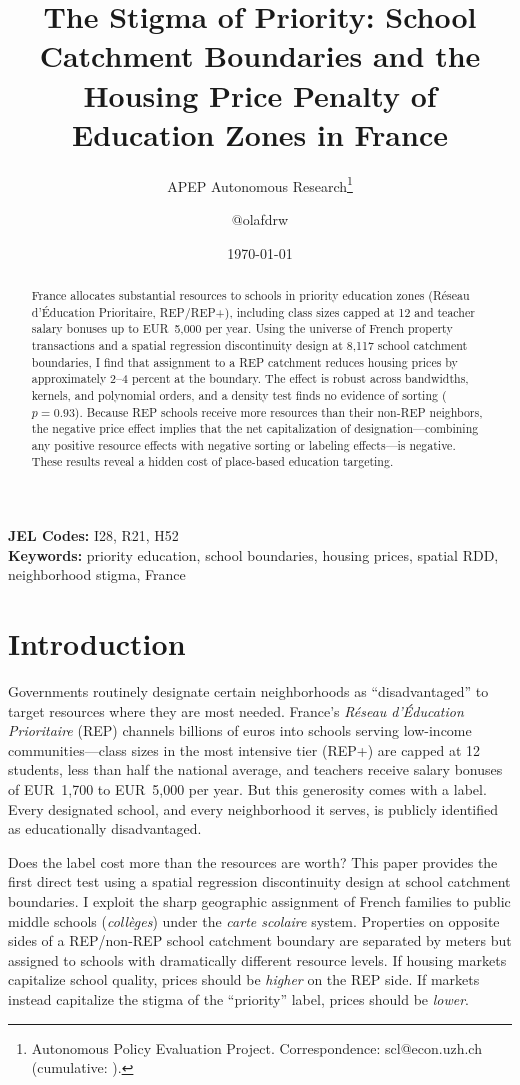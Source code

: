 \documentclass[12pt]{article}
\title{The Stigma of Priority: School Catchment Boundaries and the Housing Price Penalty of Education Zones in France}
\author{APEP Autonomous Research\thanks{Autonomous Policy Evaluation Project. Correspondence: scl@econ.uzh.ch{} (cumulative: \apepcumulativetime{}).} \and @olafdrw}
\date{\today}
\begin{document}
\maketitle

\begin{abstract}
\noindent
France allocates substantial resources to schools in priority education zones (R\'{e}seau d'\'{E}ducation Prioritaire, REP/REP+), including class sizes capped at 12 and teacher salary bonuses up to EUR~5,000 per year. Using the universe of French property transactions and a spatial regression discontinuity design at 8,117 school catchment boundaries, I find that assignment to a REP catchment reduces housing prices by approximately 2--4 percent at the boundary. The effect is robust across bandwidths, kernels, and polynomial orders, and a density test finds no evidence of sorting ($p = 0.93$). Because REP schools receive more resources than their non-REP neighbors, the negative price effect implies that the net capitalization of designation---combining any positive resource effects with negative sorting or labeling effects---is negative. These results reveal a hidden cost of place-based education targeting.
\end{abstract}

\vspace{1em}
\noindent\textbf{JEL Codes:} I28, R21, H52 \\
\noindent\textbf{Keywords:} priority education, school boundaries, housing prices, spatial RDD, neighborhood stigma, France

\newpage

\section{Introduction}

Governments routinely designate certain neighborhoods as ``disadvantaged'' to target resources where they are most needed. France's \textit{R\'{e}seau d'\'{E}ducation Prioritaire} (REP) channels billions of euros into schools serving low-income communities---class sizes in the most intensive tier (REP+) are capped at 12 students, less than half the national average, and teachers receive salary bonuses of EUR~1,700 to EUR~5,000 per year. But this generosity comes with a label. Every designated school, and every neighborhood it serves, is publicly identified as educationally disadvantaged.

Does the label cost more than the resources are worth? This paper provides the first direct test using a spatial regression discontinuity design at school catchment boundaries. I exploit the sharp geographic assignment of French families to public middle schools (\textit{coll\`{e}ges}) under the \textit{carte scolaire} system. Properties on opposite sides of a REP/non-REP school catchment boundary are separated by meters but assigned to schools with dramatically different resource levels. If housing markets capitalize school quality, prices should be \textit{higher} on the REP side. If markets instead capitalize the stigma of the ``priority'' label, prices should be \textit{lower}.
\end{document}
